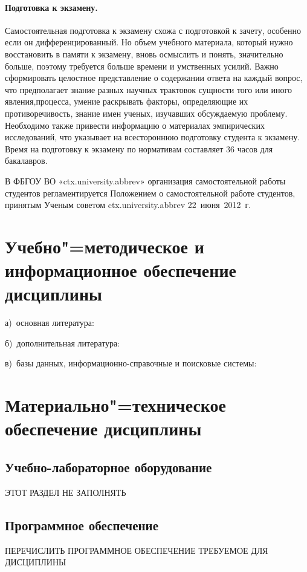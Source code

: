 \documentclass[12pt]{scrartcl}
\begin{document}
\paragraph{Подготовка к экзамену.} Самостоятельная подготовка к экзамену схожа с
подготовкой к зачету, особенно если он дифференцированный. Но объем учебного
материала, который нужно восстановить в памяти к экзамену, вновь осмыслить и понять,
значительно больше, поэтому требуется больше времени и умственных усилий. Важно
сформировать целостное представление о содержании ответа на каждый вопрос, что
предполагает знание разных научных трактовок сущности того или иного явления,процесса, умение раскрывать факторы, определяющие их противоречивость, знание имен
ученых, изучавших обсуждаемую проблему. Необходимо также привести информацию о
материалах эмпирических исследований, что указывает на всестороннюю подготовку
студента к экзамену. Время на подготовку к экзамену по нормативам составляет 36 часов
для бакалавров.

В ФБГОУ ВО «{{ctx.university.abbrev}}» организация самостоятельной работы студентов
регламентируется Положением о самостоятельной работе студентов, принятым Ученым
советом {{ctx.university.abbrev}} 22~июня~2012~г.

\section{Учебно"=методическое и информационное обеспечение дисциплины}
\noindent а)\ основная литература:

\noindent б)\ дополнительная литература:

\noindent в)\ базы данных, информационно-справочные и поисковые системы:

\section{Материально"=техническое обеспечение дисциплины}

\subsection{Учебно-лабораторное оборудование}

ЭТОТ РАЗДЕЛ НЕ ЗАПОЛНЯТЬ

\subsection{Программное обеспечение}

ПЕРЕЧИСЛИТЬ ПРОГРАММНОЕ ОБЕСПЕЧЕНИЕ ТРЕБУЕМОЕ ДЛЯ ДИСЦИПЛИНЫ
\end{document}
